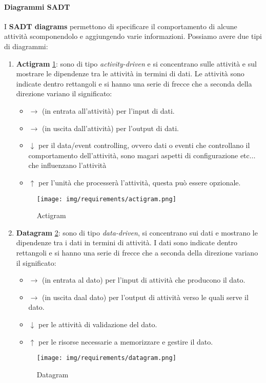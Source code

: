 \paragraph{Diagrammi SADT}
I \textbf{SADT diagrams} permettono di specificare il comportamento di alcune
attività scomponendolo e aggiungendo varie informazioni. Possiamo avere due tipi
di diagrammi:
\begin{enumerate}
    \item \textbf{Actigram} \ref{fig:actigram}: sono di tipo \textit{activity-driven}
          e si concentrano sulle attività e sul mostrare le dipendenze tra le attività
          in termini di dati. Le attività sono indicate dentro rettangoli e si hanno
          una serie di frecce che a seconda della direzione variano il significato:
          \begin{itemize}
              \item $\to$ (in entrata all'attività) per l'input di dati.
              \item $\to$ (in uscita dall'attività) per l'output di dati.
              \item $\downarrow$ per il data/event controlling, ovvero dati o
                    eventi che controllano il comportamento dell'attività, sono magari
                    aspetti di configurazione etc$\dots$ che influenzano l'attività
              \item $\uparrow$ per l'unità che processerà l'attività, questa può
                    essere opzionale.
          \end{itemize}
          \begin{figure}[!ht]
              \centering
              \texttt{[image: img/requirements/actigram.png]}
              \caption{Actigram}
              \label{fig:actigram}
          \end{figure}
    \item \textbf{Datagram} \ref{fig:datagram}: sono di tipo \textit{data-driven},
          si concentrano sui dati e mostrano le dipendenze tra i dati in termini di
          attività. I dati sono indicate dentro rettangoli e si hanno una serie di frecce
          che a seconda della direzione variano il significato:
          \begin{itemize}
              \item $\to$ (in entrata al dato) per l'input di attività che producono il dato.
              \item $\to$ (in uscita daal dato) per l'output di attività verso le quali serve il dato.
              \item $\downarrow$ per le attività di validazione del dato.
              \item $\uparrow$ per le risorse necessarie a memorizzare e gestire il dato.
          \end{itemize}
          \begin{figure}[!ht]
              \centering
              \texttt{[image: img/requirements/datagram.png]}
              \caption{Datagram}
              \label{fig:datagram}
          \end{figure}
\end{enumerate}
